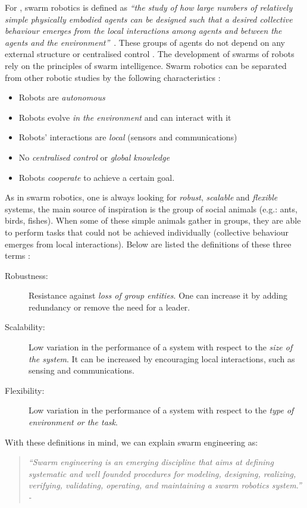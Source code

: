 \documentclass[oneside, a4paper, 12pt]{memoir}
\newcommand{\quoto}[2]{
\begin{quotation}
\textit{\enquote{#1} - #2}
\end{quotation}
}
\newcommand{\quot}[1]{\textit{\enquote{#1}}}
\begin{document}
			For \citet{csahin2005swarm}, swarm robotics is defined as \quot{the study of how large numbers of relatively simple physically embodied agents can be designed such that a desired collective behaviour emerges from the local interactions among agents and between the agents and the environment}~\citep{csahin2005swarm}. These groups of agents do not depend on any external structure or centralised control \citep{Dorigo:2014}. The development of swarms of robots rely on the principles of swarm intelligence. Swarm robotics can be separated from other robotic studies by the following characteristics \citep{brambilla2013swarm}:
%
		\begin{itemize}
			\item Robots are \emph{autonomous}
			\item Robots evolve \emph{in the environment} and can interact with it
			\item Robots' interactions are \emph{local} (sensors and communications)
			\item No \emph{centralised control} or \emph{global knowledge}
			\item Robots \emph{cooperate} to achieve a certain goal.
			\end{itemize}%
%
			As in swarm robotics, one is always looking for \emph{robust}, \emph{scalable} and \emph{flexible} systems, the main source of inspiration is the group of social animals (e.g.: ants, birds, fishes). When some of these simple animals gather in groups, they are able to perform tasks that could not be achieved individually (collective behaviour emerges from local interactions). Below are listed the definitions of these three terms \citep{brambilla2013swarm}:
			\label{def:robustness_scalability_flexibility}%
%
			\begin{description}
			\item[Robustness:] Resistance against \emph{loss of group entities}. One can increase it by adding redundancy or remove the need for a leader.
			\item[Scalability:] Low variation in the performance of a system with respect to the \emph{size of the system}. It can be increased by encouraging local interactions, such as sensing and communications.
			\item[Flexibility:] Low variation in the performance of a system with respect to the \emph{type of environment or the task}.
		\end{description}%
%
		With these definitions in mind, we can explain swarm engineering as:
		\quoto{Swarm engineering is an emerging discipline that aims at defining systematic and well founded procedures for modeling, designing, realizing, verifying, validating, operating, and maintaining a swarm robotics system.}{\cite{brambilla2013swarm}}
%
		
\end{document}
